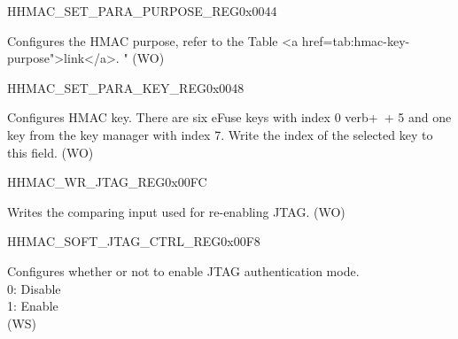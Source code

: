     \begin{register}{H}{HMAC\_SET\_PARA\_PURPOSE\_REG}{0x0044}\label{regdesc:HMACSETPARAPURPOSEREG}
    \regnewline%
    \begin{regdesc}\begin{reglist}
    \label{fielddesc:HMACPURPOSESET}\item [HMAC\_PURPOSE\_SET] Configures the HMAC purpose, refer to the Table <a href=tab:hmac-key-purpose">link</a>. " (WO)
    \end{reglist}\end{regdesc}
    \end{register}


    \begin{register}{H}{HMAC\_SET\_PARA\_KEY\_REG}{0x0048}\label{regdesc:HMACSETPARAKEYREG}
    \regnewline%
    \begin{regdesc}\begin{reglist}
    \label{fielddesc:HMACKEYSET}\item [HMAC\_KEY\_SET] Configures HMAC key. There are six eFuse keys with index 0 verb+~+ 5 and one key from the key manager with index 7. Write the index of the selected key to this field. (WO)
    \end{reglist}\end{regdesc}
    \end{register}


    \begin{register}{H}{HMAC\_WR\_JTAG\_REG}{0x00FC}\label{regdesc:HMACWRJTAGREG}
    \regnewline%
    \begin{regdesc}\begin{reglist}
    \label{fielddesc:HMACWRJTAG}\item [HMAC\_WR\_JTAG] Writes the comparing input used for re-enabling JTAG. (WO)
    \end{reglist}\end{regdesc}
    \end{register}


    \begin{register}{H}{HMAC\_SOFT\_JTAG\_CTRL\_REG}{0x00F8}\label{regdesc:HMACSOFTJTAGCTRLREG}
    \regnewline%
    \begin{regdesc}\begin{reglist}
    \label{fielddesc:HMACSOFTJTAGCTRL}\item [HMAC\_SOFT\_JTAG\_CTRL] Configures whether or not to enable JTAG authentication mode.
    \\0: Disable
    \\1: Enable
    \\ (WS)
    \end{reglist}\end{regdesc}
    \end{register}


